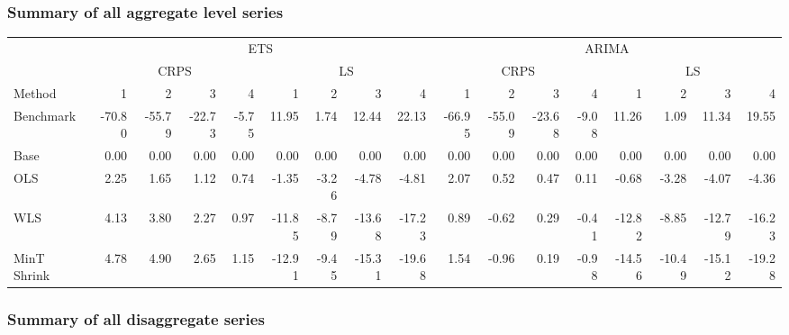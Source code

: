 \documentclass[]{article}
\begin{document}
\subsubsection{Summary of all aggregate level
series}\label{summary-of-all-aggregate-level-series-2}

\begin{table}[H]
\centering
\begin{tabular}{l|r|r|r|r|r|r|r|r|r|r|r|r|r|r|r|r}
\hline
\multicolumn{1}{c|}{ } & \multicolumn{8}{|c|}{ETS} & \multicolumn{8}{|c}{ARIMA} \\
\cline{2-9} \cline{10-17}
\multicolumn{1}{c|}{ } & \multicolumn{4}{|c|}{CRPS} & \multicolumn{4}{|c|}{LS} & \multicolumn{4}{|c|}{CRPS} & \multicolumn{4}{|c}{LS} \\
\cline{2-5} \cline{6-9} \cline{10-13} \cline{14-17}
Method & 1 & 2 & 3 & 4 & 1 & 2 & 3 & 4 & 1 & 2 & 3 & 4 & 1 & 2 & 3 & 4\\
\hline
Benchmark & -70.80 & -55.79 & -22.73 & -5.75 & 11.95 & 1.74 & 12.44 & 22.13 & -66.95 & -55.09 & -23.68 & -9.08 & 11.26 & 1.09 & 11.34 & 19.55\\
\hline
Base & 0.00 & 0.00 & 0.00 & 0.00 & 0.00 & 0.00 & 0.00 & 0.00 & 0.00 & 0.00 & 0.00 & 0.00 & 0.00 & 0.00 & 0.00 & 0.00\\
\hline
OLS & 2.25 & 1.65 & 1.12 & 0.74 & -1.35 & -3.26 & -4.78 & -4.81 & 2.07 & 0.52 & 0.47 & 0.11 & -0.68 & -3.28 & -4.07 & -4.36\\
\hline
WLS & 4.13 & 3.80 & 2.27 & 0.97 & -11.85 & -8.79 & -13.68 & -17.23 & 0.89 & -0.62 & 0.29 & -0.41 & -12.82 & -8.85 & -12.79 & -16.23\\
\hline
MinT Shrink & 4.78 & 4.90 & 2.65 & 1.15 & -12.91 & -9.45 & -15.31 & -19.68 & 1.54 & -0.96 & 0.19 & -0.98 & -14.56 & -10.49 & -15.12 & -19.28\\
\hline
\end{tabular}
\end{table}

\subsubsection{Summary of all disaggregate
series}\label{summary-of-all-disaggregate-series-2}
\end{document}
